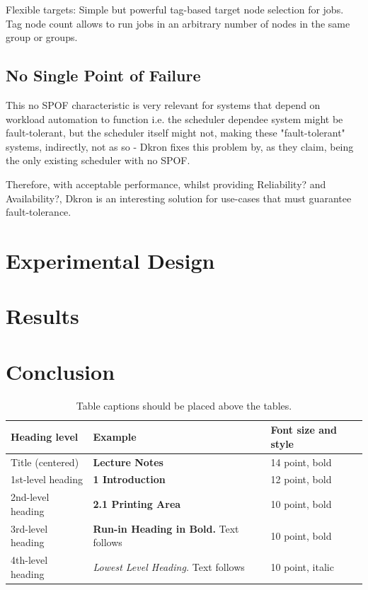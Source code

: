 \documentclass[runningheads]{llncs}
\begin{document}
Flexible targets: Simple but powerful tag-based target node selection for jobs. Tag node count allows to run jobs in an arbitrary number of nodes in the same group or groups.



\subsection{No Single Point of Failure}
This no SPOF characteristic is very relevant for systems that depend on workload automation to function i.e. the scheduler dependee
system might be fault-tolerant, but the scheduler itself might not, making these "fault-tolerant" systems, indirectly, not as
so - Dkron fixes this problem by, as they claim, being the only existing scheduler with no SPOF. %

Therefore, with acceptable performance, whilst providing Reliability? and Availability?, Dkron is an interesting solution
for use-cases that must guarantee fault-tolerance.

\section{Experimental Design}
\section{Results}
\section{Conclusion}


\begin{table}
\caption{Table captions should be placed above the
tables.}\label{tab1}
\begin{tabular}{|l|l|l|}
\hline
Heading level &  Example & Font size and style\\
\hline
Title (centered) &  {\Large\bfseries Lecture Notes} & 14 point, bold\\
1st-level heading &  {\large\bfseries 1 Introduction} & 12 point, bold\\
2nd-level heading & {\bfseries 2.1 Printing Area} & 10 point, bold\\
3rd-level heading & {\bfseries Run-in Heading in Bold.} Text follows & 10 point, bold\\
4th-level heading & {\itshape Lowest Level Heading.} Text follows & 10 point, italic\\
\hline
\end{tabular}
\end{table}
\end{document}
